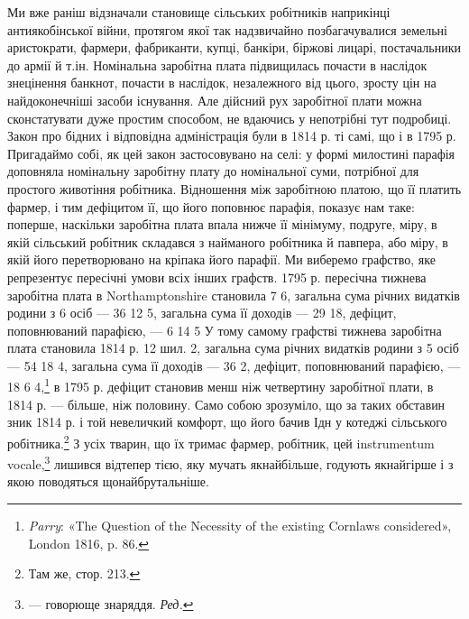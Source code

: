 Ми вже раніш відзначали становище сільських робітників
наприкінці антиякобінської війни, протягом якої так надзвичайно
позбагачувалися земельні аристократи, фармери, фабриканти,
купці, банкіри, біржові лицарі, постачальники до армії
й т.ін. Номінальна заробітна плата підвищилась почасти в наслідок
знецінення банкнот, почасти в наслідок, незалежного від
цього, зросту цін на найдоконечніші засоби існування. Але дійсний
рух заробітної плати можна сконстатувати дуже простим
способом, не вдаючись у непотрібні тут подробиці. Закон про
бідних і відповідна адміністрація були в 1814 р. ті самі, що і в
1795 р. Пригадаймо собі, як цей закон застосовувано на селі:
у формі милостині парафія доповняла номінальну заробітну
плату до номінальної суми, потрібної для простого животіння
робітника. Відношення між заробітною платою, що її платить
фармер, і тим дефіцитом її, що його поповнює парафія, показує
нам таке: поперше, наскільки заробітна плата впала нижче її
мінімуму, подруге, міру, в якій сільський робітник складався
з найманого робітника й павпера, або міру, в якій його перетворювано
на кріпака його парафії. Ми виберемо графство, яке
репрезентує пересічні умови всіх інших графств. 1795 р. пересічна
тижнева заробітна плата в Northamptonshire становила
7 6, загальна сума річних видатків родини з
6 осіб — 36 12 5, загальна сума
її доходів — 29 18, дефіцит, поповнюваний
парафією, — 6 14 5
У тому самому графстві тижнева заробітна плата становила 1814 р.
12 шил. 2, загальна сума річних видатків родини з 5 осіб —
54 18 4, загальна сума її доходів
— 36 2, дефіцит, поповнюваний
парафією, — 18 6 4,\footnote{
\emph{Parry}: «The Question of the Necessity of the existing Cornlaws
considered», London 1816, p. 86.
} в 1795 р.
дефіцит становив менш ніж четвертину заробітної плати, в
1814 р. — більше, ніж половину. Само собою зрозуміло, що за
таких обставин зник 1814 р. і той невеличкий комфорт, що його
бачив Ідн у котеджі сільського робітника.\footnote{
Там же, стор. 213.
} З усіх тварин,
що їх тримає фармер, робітник, цей instrumentum vocale,\footnote*{
— говорюще знаряддя. \emph{Ред.}
} лишився
відтепер тією, яку мучать якнайбільше, годують якнайгірше і
з  якою поводяться щонайбрутальніше.


